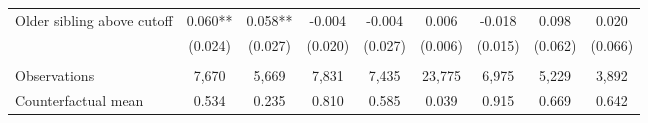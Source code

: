{{\begin{tabular}{lcccccccc}
Older sibling above cutoff&       0.060** &       0.058** &      -0.004   &      -0.004   &       0.006   &      -0.018   &       0.098   &       0.020   \\
                    &     (0.024)   &     (0.027)   &     (0.020)   &     (0.027)   &     (0.006)   &     (0.015)   &     (0.062)   &     (0.066)   \\
                    &               &               &               &               &               &               &               &               \\
Observations        &       7,670   &       5,669   &       7,831   &       7,435   &      23,775   &       6,975   &       5,229   &       3,892   \\
Counterfactual mean &       0.534   &       0.235   &       0.810   &       0.585   &       0.039   &       0.915   &       0.669   &       0.642   \\
 

\bottomrule
\end{tabular}
}
}
